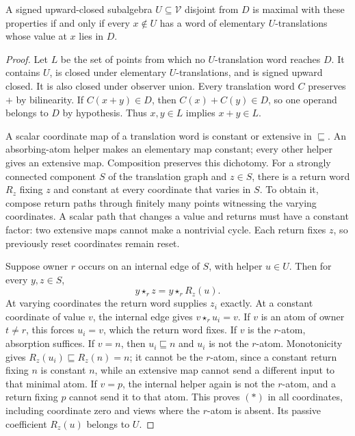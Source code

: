 \begin{theorem}
\label{core:thm:maximal-linear-separation}
A signed upward-closed subalgebra $U\subseteq\mathcal V$ disjoint from
$D$ is maximal with these properties if and only if every $x\notin U$
has a word of elementary $U$-translations whose value at $x$ lies in $D$.
\end{theorem}
\begin{proof}
Let $L$ be the set of points from which no $U$-translation word reaches
$D$. It contains $U$, is closed under elementary $U$-translations, and is
signed upward closed. It is also closed under observer union. Every
translation word $C$ preserves $+$ by bilinearity. If $C(x+y)\in D$,
then $C(x)+C(y)\in D$, so one operand belongs to $D$ by hypothesis.
Thus $x,y\in L$ implies $x+y\in L$.

A scalar coordinate map of a translation word is constant or extensive
in $\sqsubseteq$. An absorbing-atom helper makes an elementary map
constant; every other helper gives an extensive map. Composition
preserves this dichotomy. For a strongly connected component $S$ of the
translation graph and $z\in S$, there is a return word $R_z$ fixing $z$
and constant at every coordinate that varies in $S$. To obtain it,
compose return paths through finitely many points witnessing the varying
coordinates. A scalar path that changes a value and returns must have a
constant factor: two extensive maps cannot make a nontrivial cycle.
Each return fixes $z$, so previously reset coordinates remain reset.

Suppose owner $r$ occurs on an internal edge of $S$, with helper $u\in U$.
Then for every $y,z\in S$,
\[
 y\star_r z=y\star_r R_z(u).                         \tag{$*$}
\]
At varying coordinates the return word supplies $z_i$ exactly. At a
constant coordinate of value $v$, the internal edge gives
$v\star_r u_i=v$. If $v$ is an atom of owner $t\ne r$, this forces
$u_i=v$, which the return word fixes. If $v$ is the $r$-atom, absorption
suffices. If $v=n$, then $u_i\sqsubseteq n$ and $u_i$ is not the
$r$-atom. Monotonicity gives $R_z(u_i)\sqsubseteq R_z(n)=n$; it cannot
be the $r$-atom, since a constant return fixing $n$ is constant $n$,
while an extensive map cannot send a different input to that minimal atom.
If $v=p$, the internal helper again is not the $r$-atom, and a return
fixing $p$ cannot send it to that atom. This proves $(*)$ in all
coordinates, including coordinate zero and views where the $r$-atom is
absent. Its passive coefficient $R_z(u)$ belongs to $U$.


\end{proof}
